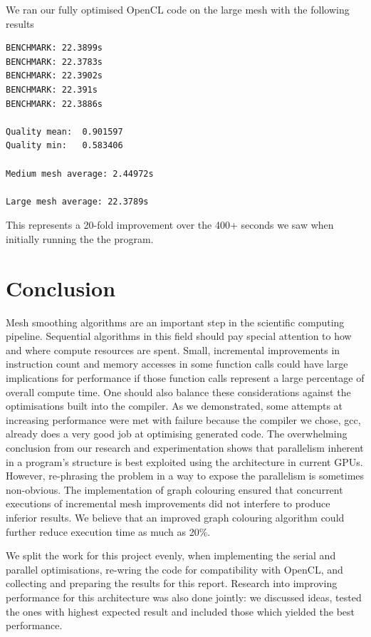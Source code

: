 \documentclass[a4paper,12pt, twocolumn]{article}
\begin{document}
We ran our fully optimised OpenCL code on the large mesh with the following results
\begin{verbatim}
BENCHMARK: 22.3899s
BENCHMARK: 22.3783s
BENCHMARK: 22.3902s
BENCHMARK: 22.391s
BENCHMARK: 22.3886s

Quality mean:  0.901597
Quality min:   0.583406

Medium mesh average: 2.44972s

Large mesh average: 22.3789s
\end{verbatim}
This represents a 20-fold improvement over the 400+ seconds we saw when initially running the the program.



\section{Conclusion}
Mesh smoothing algorithms are an important step in the scientific computing pipeline.  Sequential algorithms in this field  should pay special attention to how and where compute resources are spent.  Small, incremental improvements in instruction count and memory accesses in some function calls could have large implications for performance if those function calls represent a large percentage of overall compute time.  One should also balance these considerations against the optimisations built into the compiler.  As we demonstrated, some attempts at increasing performance were met with failure because the compiler we chose, gcc, already does a very good job at optimising generated code.  The overwhelming conclusion from our research and experimentation shows that parallelism inherent in a program's structure is best exploited using the architecture in current GPUs.  However, re-phrasing the problem in a way to expose the parallelism is sometimes non-obvious.  The implementation of graph colouring ensured that concurrent executions of incremental mesh improvements did not interfere to produce inferior results.  We believe that an improved graph colouring algorithm could further reduce execution time as much as 20\%.

We split the work for this project evenly, when implementing the serial and parallel optimisations, re-wring the code for compatibility with OpenCL, and collecting and preparing the results for this report.  Research into improving performance for this architecture was also done jointly: we discussed ideas, tested the ones with highest expected result and included those which yielded the best performance.
\end{document}

